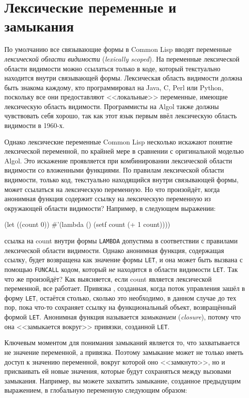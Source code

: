\section{Лексические переменные и замыкания}

По умолчанию все связывающие формы в Common Lisp вводят переменные \textit{лексической
  области видимости} (\textit{lexically scoped}). На переменные лексической области
видимости можно ссылаться только в коде, который текстуально находится внутри связывающей
формы. Лексическая область видимости должна быть знакома каждому, кто программировал на
Java, C, Perl или Python, поскольку все они предоставляют <<локальные>> переменные, имеющие
лексическую область видимости. Программисты на Algol также должны чувствовать себя хорошо,
так как этот язык первым ввёл лексическую область видимости в 1960-х.

Однако лексические переменные Common Lisp несколько искажают понятие лексической
переменной, по крайней мере в сравнении с оригинальной моделью Algol. Это искажение
проявляется при комбинировании лексической области видимости со вложенными функциями. По
правилам лексической области видимости, только код, текстуально находящийся внутри
связывающей формы, может ссылаться на лексическую переменную. Но что произойдёт, когда
анонимная функция содержит ссылку на лексическую переменную из окружающей области
видимости? Например, в следующем выражении:

\begin{myverb}
(let ((count 0)) #'(lambda () (setf count (+ 1 count))))
\end{myverb}

\noindent{}ссылка на count внутри формы \lstinline{LAMBDA} допустима в соответствии с правилами
лексической области видимости. Однако анонимная функция, содержащая ссылку, будет
возвращена как значение формы \lstinline{LET}, и она может быть вызвана с помощью
\lstinline{FUNCALL} кодом, который \textit{не} находится в области видимости
\lstinline{LET}. Так что же произойдёт? Как выясняется, если count является лексической
переменной, все работает. Привязка , созданная, когда поток управления зашёл в форму
\lstinline{LET}, остаётся столько, сколько это необходимо, в данном случае до тех пор, пока
что-то сохраняет ссылку на функциональный объект, возвращённый формой
\lstinline{LET}. Анонимная функция называется \textit{замыканием} (\textit{closure}), потому
что она <<замыкается вокруг>> привязки, созданной \lstinline{LET}.

Ключевым моментом для понимания замыканий является то, что захватывается не значение
переменной, а привязка. Поэтому замыкание может не только иметь доступ к значению
переменной, вокруг которой оно <<замкнуто>>, но и присваивать ей новые значения, которые
будут сохраняться между вызовами замыкания. Например, вы можете захватить замыкание,
созданное предыдущим выражением, в глобальную переменную следующим образом:

